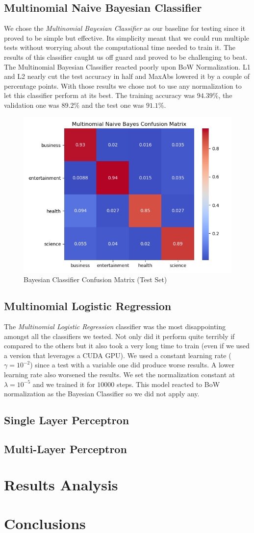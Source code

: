 \documentclass[10pt,a4paper]{report}
\begin{document}
\subsection{Multinomial Naive Bayesian Classifier}
We chose the \textit{Multinomial Bayesian Classifier} as our baseline for testing since it proved to be simple but effective. Its simplicity meant that we could run multiple tests without worrying about the computational time needed to train it. The results of this classifier caught us off guard and proved to be challenging to beat. The Multinomial Bayesian Classifier reacted poorly upon BoW Normalization. L1 and L2 nearly cut the test accuracy in half and MaxAbs lowered it by a couple of percentage points. With those results we chose not to use any normalization to let this classifier perform at its best. The training accuracy was $94.39 \%$, the validation one was $89.2 \%$ and the test one was $91.1 \%$.
\begin{figure}[!ht]
\centering
\includegraphics[width=0.5\linewidth]{bayes_confmat.png}
\caption{Bayesian Classifier Confusion Matrix (Test Set)}
\label{fig:bayes_confmat}
\end{figure}
\subsection{Multinomial Logistic Regression}
The \textit{Multinomial Logistic Regression} classifier was the most disappointing amongst all the classifiers we tested. Not only did it perform quite terribly if compared to the others but it also took a very long time to train (even if we used a version that leverages a CUDA GPU). We used a constant learning rate ($\gamma=10^{-2}$) since a test with a variable one did produce worse results. A lower learning rate also worsened the results. We set the normalization constant at $\lambda=10^{-5}$ and we trained it for $10000$ steps. This model reacted to BoW normalization as the Bayesian Classifier so we did not apply any. 
\subsection{Single Layer Perceptron}
\subsection{Multi-Layer Perceptron}
\section{Results Analysis}
\section{Conclusions}
\end{document}
